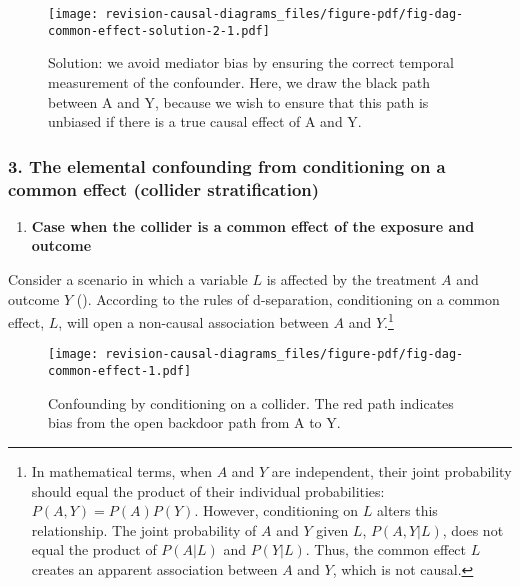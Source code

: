 \documentclass[
  singlecolumn,
  9pt]{article}
\providecommand{\tightlist}{%
  \setlength{\itemsep}{0pt}\setlength{\parskip}{0pt}}\usepackage{longtable,booktabs,array}
\begin{document}
\begin{figure}

{\centering \texttt{[image: revision-causal-diagrams\_files/figure-pdf/fig-dag-common-effect-solution-2-1.pdf]}

}

\caption{\label{fig-dag-common-effect-solution-2}Solution: we avoid
mediator bias by ensuring the correct temporal measurement of the
confounder. Here, we draw the black path between A and Y, because we
wish to ensure that this path is unbiased if there is a true causal
effect of A and Y.}

\end{figure}

\subsubsection{3. The elemental confounding from conditioning on a
common effect (collider
stratification)}\label{the-elemental-confounding-from-conditioning-on-a-common-effect-collider-stratification}

\begin{enumerate}
\def\labelenumi{\arabic{enumi}.}
\tightlist
\item
  \textbf{Case when the collider is a common effect of the exposure and
  outcome}
\end{enumerate}

Consider a scenario in which a variable \(L\) is affected by the
treatment \(A\) and outcome \(Y\) (). According to the rules of d-separation, conditioning on a
common effect, \(L\), will open a non-causal association between \(A\)
and \(Y\).\footnote{In mathematical terms, when \(A\) and \(Y\) are
  independent, their joint probability should equal the product of their
  individual probabilities: \(P(A, Y) = P(A)P(Y)\). However,
  conditioning on \(L\) alters this relationship. The joint probability
  of \(A\) and \(Y\) given \(L\), \(P(A, Y | L)\), does not equal the
  product of \(P(A | L)\) and \(P(Y | L)\). Thus, the common effect
  \(L\) creates an apparent association between \(A\) and \(Y\), which
  is not causal.}

\begin{figure}

{\centering \texttt{[image: revision-causal-diagrams\_files/figure-pdf/fig-dag-common-effect-1.pdf]}

}

\caption{\label{fig-dag-common-effect}Confounding by conditioning on a
collider. The red path indicates bias from the open backdoor path from A
to Y.}

\end{figure}
\end{document}
